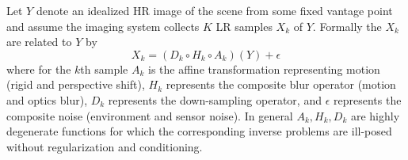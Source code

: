 Let $Y$ denote an idealized HR image of the scene from some fixed vantage point and assume the imaging system collects $K$ LR samples $X_k$ of $Y$.
%
Formally the $X_k$ are related to $Y$ by
\begin{equation}
    X_k = (D_k \circ H_k \circ A_k) (Y) + \epsilon
\end{equation}
where for the $k$th sample $A_k$ is the affine transformation representing motion (rigid and perspective shift), $H_k$ represents the composite blur operator (motion and optics blur), $D_k$ represents the down-sampling operator, and $\epsilon$ represents the composite noise (environment and sensor noise).
%
In general $A_k, H_k, D_k$ are highly degenerate functions for which the corresponding inverse problems are ill-posed without regularization and conditioning.
